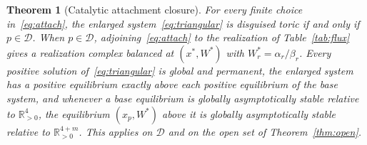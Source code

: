\documentclass[11pt,a4paper]{article}
\theoremstyle{plain}
\newtheorem{theorem}{Theorem}[section]
\theoremstyle{definition}
\theoremstyle{remark}
\newcommand{\R}{\mathbb{R}}
\newcommand{\Rp}{\R_{>0}}
\newcommand{\DT}{\mathcal{D}}
\newcommand{\xs}{x^{*}}
\begin{document}
\begin{theorem}[Catalytic attachment closure]\label{thm:assembly}
For every finite choice in~\eqref{eq:attach}, the enlarged system~\eqref{eq:triangular} is disguised toric if and only if $p\in\DT$. When $p\in\DT$, adjoining~\eqref{eq:attach} to the realization of Table~\ref{tab:flux} gives a realization complex balanced at $(\xs,W^*)$ with $W_r^*=\alpha_r/\beta_r$. Every positive solution of~\eqref{eq:triangular} is global and permanent, the enlarged system has a positive equilibrium exactly above each positive equilibrium of the base system, and whenever a base equilibrium is globally asymptotically stable relative to $\Rp^4$, the equilibrium $(x_p,W^*)$ above it is globally asymptotically stable relative to $\Rp^{4+m}$. This applies on $\DT$ and on the open set of Theorem~\ref{thm:open}.
\end{theorem}
\end{document}

